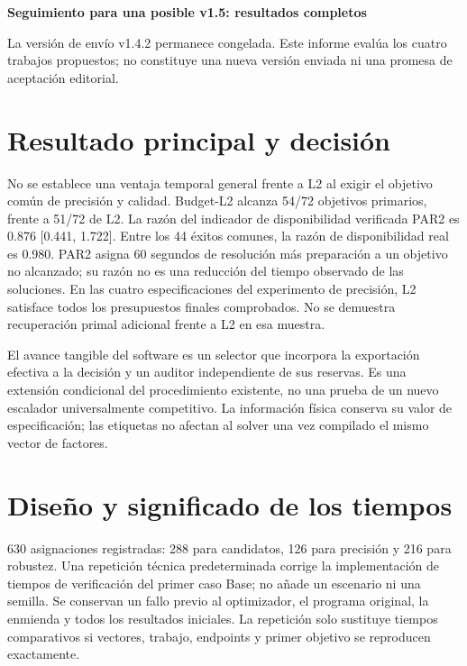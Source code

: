 \documentclass[a4paper,10pt]{article}
\begin{document}
\begin{center}\Large\bfseries Seguimiento para una posible v1.5: resultados completos\end{center}

La versión de envío v1.4.2 permanece congelada. Este informe evalúa los
cuatro trabajos propuestos; no constituye una nueva versión enviada ni
una promesa de aceptación editorial.

\section*{Resultado principal y decisión}

No se establece una ventaja temporal general frente a L2 al exigir el objetivo común de precisión y calidad.
Budget-L2 alcanza 54/72 objetivos primarios, frente a 51/72 de L2.
La razón del indicador de disponibilidad verificada PAR2 es 0.876 [0.441, 1.722].
Entre los 44 éxitos comunes, la razón de disponibilidad real es 0.980.
PAR2 asigna 60 segundos de resolución más preparación a un objetivo no
alcanzado; su razón no es una reducción del tiempo observado de las soluciones.
En las cuatro especificaciones del experimento de precisión, L2 satisface todos los presupuestos finales comprobados. No se demuestra recuperación primal adicional frente a L2 en esa muestra.

El avance tangible del software es un selector que incorpora la exportación
efectiva a la decisión y un auditor independiente de sus reservas. Es una
extensión condicional del procedimiento existente, no una prueba de un
nuevo escalador universalmente competitivo. La información física conserva
su valor de especificación; las etiquetas no afectan al solver una vez
compilado el mismo vector de factores.

\section*{Diseño y significado de los tiempos}

630 asignaciones registradas: 288 para candidatos, 126 para precisión y
216 para robustez. Una repetición técnica predeterminada corrige la
implementación de tiempos de verificación del primer caso Base; no añade
un escenario ni una semilla. Se conservan un fallo previo al optimizador,
el programa original, la enmienda y todos los resultados iniciales.
La repetición solo sustituye tiempos comparativos si vectores, trabajo,
endpoints y primer objetivo se reproducen exactamente.
\end{document}
